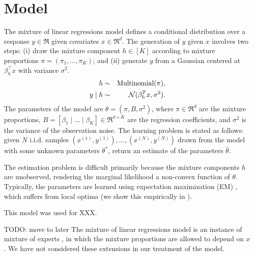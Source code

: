 \section{Model}
\label{sec:model}

\newcommand{\xn}[1]{x^{(#1)}}
\newcommand{\xni}{\xn{i}}
\newcommand{\yn}[1]{y^{(#1)}}
\newcommand{\yni}{\yn{i}}

The mixture of linear regressions model \citep{VieleTong2002} defines
a conditional distribution over a response $y \in \Re$
given covariates $x \in \Re^d$.
The generation of $y$ given $x$ involves two steps:
(i) draw the mixture component $h \in [K]$ according to mixture proportions
$\pi = (\pi_1, \dots, \pi_K)$;
and (ii) generate $y$ from a Gaussian centered at $\beta_h^\top x$ with
variance $\sigma^2$.
\begin{eqnarray*}
  h &\sim& \operatorname{Multinomial}(\pi), \\
  y \mid h &\sim& \mathcal{N}( \beta_{h}^T x,  \sigma^2 ).
\end{eqnarray*}
The parameters of the model are $\theta = (\pi, B, \sigma^2)$,
where $\pi \in \Re^d$ are the mixture proportions,
$B = [\beta_1 \mid \dots \mid \beta_K] \in \Re^{d \times K}$
are the regression coefficients,
and $\sigma^2$ is the variance of the observation noise.
The learning problem is stated as follows:
given $N$ i.i.d. samples $(\xn{1}, \yn{1}), \dots, (\xn{N}, \yn{N})$
drawn from the model with some unknown parameters $\theta^*$,
return an estimate of the parameters $\hat\theta$.



The estimation problem is difficult primarily because the mixture
components $h$ are unobserved, rendering the marginal likelihood
a non-convex function of $\theta$.
Typically, the parameters are learned using
expectation maximization (EM) \cite{VieleTong2002},
which suffers from local optima
(we show this empirically in ).

This model was used for XXX.

TODO: move to later
The mixture of linear regressions model is an instance of
mixture of experts \cite{jacobs91},
in which the mixture proportions are allowed to depend on $x$.
We have not considered these extensions in our treatment of the model.
